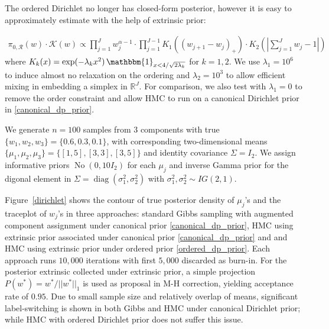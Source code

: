 \documentclass[10pt]{article}
\newcommand{\mc}[1]{\mathcal{#1}}
\DeclareMathOperator{\No}{No}
\DeclareMathOperator{\diag}{diag}
\DeclareMathOperator{\1}{\mathbbm{1}}
\begin{document}
The ordered Dirichlet no longer has closed-form posterior, however it is easy to approximately estimate with the help of extrinsic prior:

 \begin{equation*}
\begin{aligned}
\pi_{0,\mc R}(w)\cdot \mc K(w) \propto \prod_{j=1}^J w_j^{\alpha-1} \cdot \prod_{j=1}^{J-1} K_{1}{\left(( w_{j+1} - w_j )_+\right)} \cdot K_2 ( |{\sum_{j=1}^J w_j - 1}|)
\end{aligned}
\end{equation*}
where $K_{k}(x)=\exp(- \lambda_k x^2) \1_{x<4/\sqrt{2\lambda_k}}$ for  $k=1,2$. We use $\lambda_1 = 10^6$ to induce almost no relaxation on the ordering and $\lambda_2 = 10^3$ to allow efficient mixing in embedding a simplex in $\mathbb{R}^J$. For comparison, we also test with $\lambda_1=0$ to remove the order constraint and allow HMC to run on a canonical Dirichlet prior in \eqref{canonical_dp_prior}.

We generate $n=100$ samples from $3$ components with true $\{w_1,w_2,w_3\}=\{0.6,0.3,0.1\}$, with corresponding two-dimensional means $\{\mu_1,\mu_2,\mu_3\} = \{[1,5], [3,3], [3,5]\}$ and identity covariance $\Sigma = I_2$. We assign informative priors $\No(0,10 I_2)$ for each $\mu_j$ and inverse Gamma prior for the digonal element in $\Sigma=\diag(\sigma_1^2,\sigma_2^2)$ with $\sigma^2_1, \sigma^2_2\sim IG(2,1)$.  

Figure~\ref{dirichlet} shows the contour of true posterior density of $\mu_j$'s and the traceplot of $w_j$'s in three approaches: standard Gibbs sampling with augmented component assignment \citep{diebolt1994estimation} under canonical prior \eqref{canonical_dp_prior}, HMC using extrinsic prior associated under canonical  prior \eqref{canonical_dp_prior} and and HMC using extrinsic prior under ordered prior \eqref{ordered_dp_prior}. Each approach runs $10,000$ iterations with first $5,000$ discarded as burn-in. For the posterior extrinsic collected under extrinsic prior, a simple projection $P(w^*)=w^*/||w^*||_1$ is used as proposal in M-H correction, yielding acceptance rate of $0.95$. Due to small sample size and relatively overlap of means, significant label-switching is shown in both Gibbs and HMC under canonical Dirichlet prior; while HMC with ordered Dirichlet prior does not suffer this issue.
\end{document}
